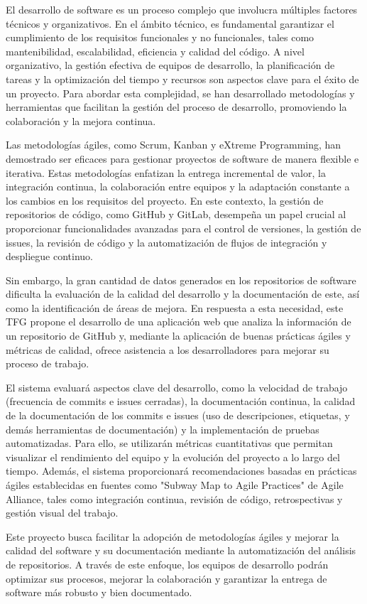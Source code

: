 
El desarrollo de software es un proceso complejo que involucra múltiples factores técnicos y organizativos. En el ámbito técnico, es fundamental garantizar el cumplimiento de los requisitos funcionales y no funcionales, tales como mantenibilidad, escalabilidad, eficiencia y calidad del código. A nivel organizativo, la gestión efectiva de equipos de desarrollo, la planificación de tareas y la optimización del tiempo y recursos son aspectos clave para el éxito de un proyecto. Para abordar esta complejidad, se han desarrollado metodologías y herramientas que facilitan la gestión del proceso de desarrollo, promoviendo la colaboración y la mejora continua.

Las metodologías ágiles, como Scrum, Kanban y eXtreme Programming, han demostrado ser eficaces para gestionar proyectos de software de manera flexible e iterativa. Estas metodologías enfatizan la entrega incremental de valor, la integración continua, la colaboración entre equipos y la adaptación constante a los cambios en los requisitos del proyecto. En este contexto, la gestión de repositorios de código, como GitHub y GitLab, desempeña un papel crucial al proporcionar funcionalidades avanzadas para el control de versiones, la gestión de issues, la revisión de código y la automatización de flujos de integración y despliegue continuo.

Sin embargo, la gran cantidad de datos generados en los repositorios de software dificulta la evaluación de la calidad del desarrollo y la documentación de este, así como la identificación de áreas de mejora. En respuesta a esta necesidad, este TFG propone el desarrollo de una aplicación web que analiza la información de un repositorio de GitHub y, mediante la aplicación de buenas prácticas ágiles y métricas de calidad, ofrece asistencia a los desarrolladores para mejorar su proceso de trabajo.

El sistema evaluará aspectos clave del desarrollo, como la velocidad de trabajo (frecuencia de commits e issues cerradas), la documentación continua, la calidad de la documentación de los commits e issues (uso de descripciones, etiquetas, y demás herramientas de documentación)  y la implementación de pruebas automatizadas. Para ello, se utilizarán métricas cuantitativas que permitan visualizar el rendimiento del equipo y la evolución del proyecto a lo largo del tiempo. Además, el sistema proporcionará recomendaciones basadas en prácticas ágiles establecidas en fuentes como "Subway Map to Agile Practices" de Agile Alliance, tales como integración continua, revisión de código, retrospectivas y gestión visual del trabajo.

Este proyecto busca facilitar la adopción de metodologías ágiles y mejorar la calidad del software y su documentación mediante la automatización del análisis de repositorios. A través de este enfoque, los equipos de desarrollo podrán optimizar sus procesos, mejorar la colaboración y garantizar la entrega de software más robusto y bien documentado.
